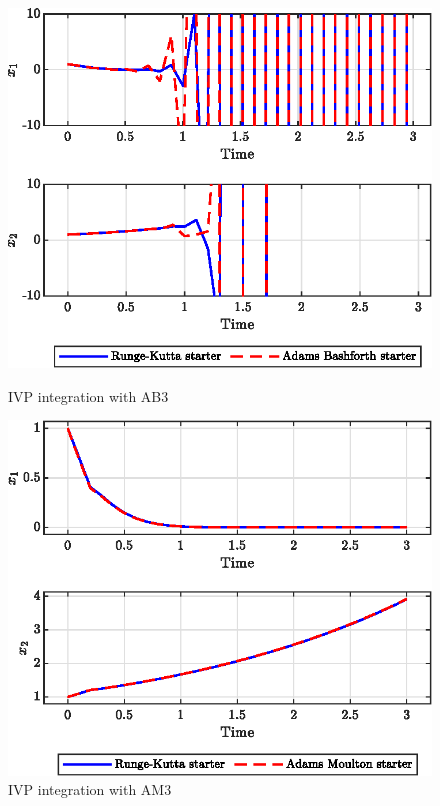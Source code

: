 \documentclass[11pt,a4paper,oneside]{article}
\begin{document}
\begin{figure}[htb]
    \centering
    \begin{minipage}{0.45\textwidth}
        \centering
        \includegraphics*[width=\textwidth, keepaspectratio]{ex7_ab.eps}
        \caption[]{\label{fig:ex7_ab} IVP integration with AB3}
    \end{minipage}
    \hspace{0.05\textwidth}
    \begin{minipage}{0.45\textwidth}
        \centering
        \includegraphics*[width=\textwidth, keepaspectratio]{ex7_am.eps}
        \caption[]{\label{fig:ex7_am} IVP integration with AM3}
    \end{minipage}
\end{figure}
\end{document}
